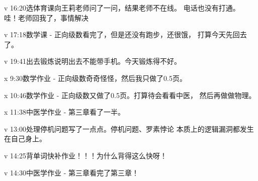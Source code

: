 \documentclass{peterlitsdoc}
\begin{document}
\begin{pltplan}
\item[v]{16:20}{选体育课}{向王莉老师问了一问，结果老师不在线。
    电话也没有打通。\\ 哇！老师回我了，事情解决}
\item[v]{17:18}{数学课 - 正向级数}{看完了，但是还没有跑步，还很饿，
    打算今天先回去了。}
\item[v]{19:41}{出去锻炼}{说明出去不能带手机。今天锻炼得不好。}
\item[x]{9:30}{数学作业 - 正向级数}{奇奇怪怪，然后我只做了0.5页。}
\item[x]{10:46}{数学作业 - 正向级数}{又做了0.5页。打算待会看看中医，
    然后再做做物理。}
\item[x]{11:38}{中医学作业 - 第三章}{看了一半。}
\item[v]{13:00}{处理停机问题}{写了一点点。停机问题、罗素悖论
    本质上的逻辑漏洞都发生在自己身上。}
\item[v]{14:25}{背单词}{快补作业！！！为什么背得这么快呀！}
\item[v]{14:30}{中医学作业 - 第三章}{看完了第三章！}
\end{pltplan}

\newpage

\end{document}

